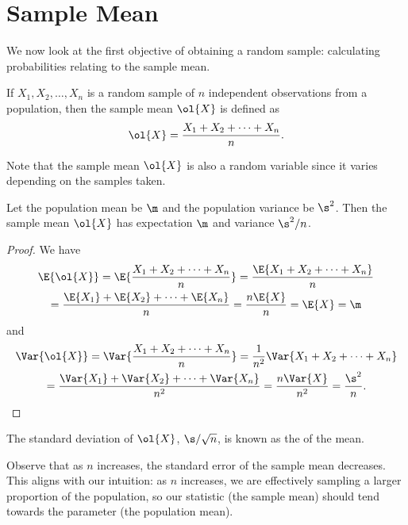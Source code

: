 \section{Sample Mean}

We now look at the first objective of obtaining a random sample: calculating probabilities relating to the sample mean.

\begin{definition}
    If $X_1, X_2, \dots, X_n$ is a random sample of $n$ independent observations from a population, then the sample mean $\ol{X}$ is defined as \[\ol{X} = \frac{X_1 + X_2 + \dots + X_n}{n}.\]
\end{definition}

Note that the sample mean $\ol{X}$ is also a random variable since it varies depending on the samples taken.

\begin{proposition}
    Let the population mean be $\m$ and the population variance be $\s^2$. Then the sample mean $\ol{X}$ has expectation $\m$ and variance $\s^2/n$.
\end{proposition}
\begin{proof}
    We have
    \begin{gather*}
        \E{\ol{X}} = \E{\frac{X_1 + X_2 + \dots + X_n}{n}} = \frac{\E{X_1 + X_2 + \dots + X_n}}n\\
        = \frac{\E{X_1} + \E{X_2} + \dots + \E{X_n}}n = \frac{n \E{X}}n = \E{X} = \m
    \end{gather*}
    and
    \begin{gather*}
        \Var{\ol{X}} = \Var{\frac{X_1 + X_2 + \dots + X_n}{n}} = \frac1{n^2} \Var{X_1 + X_2 + \dots + X_n} \\
        = \frac{\Var{X_1} + \Var{X_2} + \dots + \Var{X_n}}{n^2} = \frac{n \Var{X}}{n^2} = \frac{\s^2}{n}.
    \end{gather*}
\end{proof}

\begin{definition}
    The standard deviation of $\ol{X}$, $\s/\sqrt{n}$, is known as the  of the mean.
\end{definition}

Observe that as $n$ increases, the standard error of the sample mean decreases. This aligns with our intuition: as $n$ increases, we are effectively sampling a larger proportion of the population, so our statistic (the sample mean) should tend towards the parameter (the population mean).

